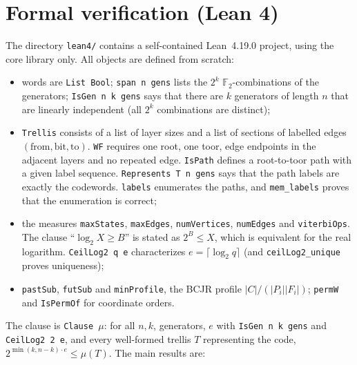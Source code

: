 \documentclass[11pt]{article}
\theoremstyle{definition}
\theoremstyle{remark}
\newcommand{\F}{\mathbb{F}}
\begin{document}
\section{Formal verification (Lean 4)}
The directory \texttt{lean4/} contains a self-contained Lean~4.19.0 project, using the
core library only. All objects are defined from scratch:
\begin{itemize}
\item words are \texttt{List Bool}; \texttt{span n gens} lists the $2^k$
$\F_2$-combinations of the generators; \texttt{IsGen n k gens} says that there are $k$
generators of length $n$ that are linearly independent (all $2^k$ combinations are
distinct);
\item \texttt{Trellis} consists of a list of layer sizes and a list of sections of labelled
edges $(\text{from},\text{bit},\text{to})$. \texttt{WF} requires one root, one toor,
edge endpoints in the adjacent layers and no repeated edge. \texttt{IsPath} defines a
root-to-toor path with a given label sequence. \texttt{Represents T n gens} says that the path labels are
exactly the codewords. \texttt{labels} enumerates the paths, and \texttt{mem\_labels}
proves that the enumeration is correct;
\item the measures \texttt{maxStates}, \texttt{maxEdges}, \texttt{numVertices},
\texttt{numEdges} and \texttt{viterbiOps}. The clause ``$\log_2 X\ge B$'' is stated as
$2^B\le X$, which is equivalent for the real logarithm. \texttt{CeilLog2 q e} characterizes
$e=\lceil\log_2q\rceil$ (and \texttt{ceilLog2\_unique} proves uniqueness);
\item \texttt{pastSub}, \texttt{futSub} and \texttt{minProfile}, the BCJR profile
$|C|/(|P_i||F_i|)$; \texttt{permW} and \texttt{IsPermOf} for coordinate orders.
\end{itemize}
The clause is \texttt{Clause $\mu$}: for all $n,k$, generators, $e$ with
\texttt{IsGen n k gens} and \texttt{CeilLog2 2 e}, and every well-formed trellis $T$
representing the code, $2^{\min(k,n-k)\cdot e}\le\mu(T)$. The main results are:
\end{document}
